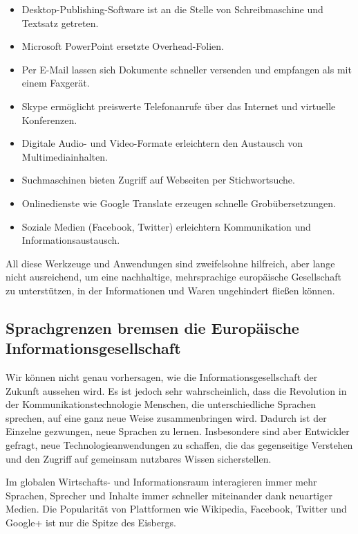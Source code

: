 \documentclass[]{../../metanetpaper}
\begin{document}
\begin{multicols}{2}
\begin{itemize}
\item Desktop-Publishing-Software ist an die Stelle von Schreibmaschine und Textsatz getreten.
\item Microsoft PowerPoint ersetzte Overhead-Folien.
\item Per E-Mail lassen sich Dokumente schneller versenden und empfangen als mit einem Faxgerät.
\item Skype ermöglicht preiswerte Telefonanrufe über das Internet und virtuelle Konferenzen.
\item Digitale Audio- und Video-Formate erleichtern den Austausch von Multimediainhalten.
\item Suchmaschinen bieten Zugriff auf Webseiten per Stichwortsuche.
\item Onlinedienste wie Google Translate erzeugen schnelle Grobübersetzungen.
\item Soziale Medien (Facebook, Twitter) erleichtern Kommunika\-tion und  Informationsaustausch.
\end{itemize}

All diese Werkzeuge und Anwendungen sind zweifelsohne hilfreich, aber lange nicht ausreichend, um eine nachhaltige, mehrsprachige europäische Gesellschaft zu unterstützen, in der Informationen und Waren ungehindert fließen können.

\subsection{Sprachgrenzen bremsen die Europäische Informations\-ge\-sell\-schaft}
  
Wir können nicht genau vorhersagen, wie die Informationsgesellschaft der Zukunft aussehen wird. Es ist jedoch sehr wahrscheinlich, dass die Revolution in der Kommunikationstechnologie Menschen, die unterschiedliche Sprachen sprechen, auf eine ganz neue Weise zusammenbringen wird. Dadurch ist der Einzelne gezwungen, neue Sprachen zu lernen. Insbesondere sind aber Entwickler gefragt, neue Technologieanwendungen zu schaffen, die das gegenseitige Verstehen und den Zugriff auf gemeinsam nutzbares Wissen sicherstellen.


Im globalen Wirtschafts- und Informationsraum interagieren immer mehr Sprachen, Sprecher und Inhalte immer schneller miteinander dank neuartiger Medien. Die Popularität von Plattformen wie Wikipedia, Facebook, Twitter und Google+ ist nur die Spitze des Eisbergs.


\end{multicols}
\end{document}
